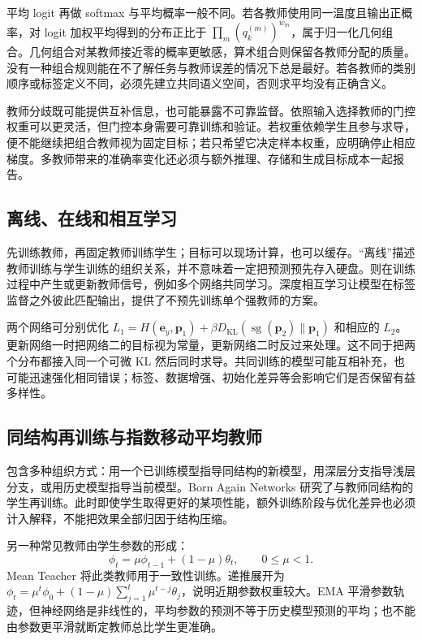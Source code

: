 \documentclass[UTF8,12pt,a4paper,fontset=fandol]{ctexart}
\begin{document}
平均 logit 再做 softmax 与平均概率一般不同。若各教师使用同一温度且输出正概率，对 logit 加权平均得到的分布正比于 $\prod_m(q_k^{(m)})^{w_m}$，属于归一化几何组合。几何组合对某教师接近零的概率更敏感，算术组合则保留各教师分配的质量。没有一种组合规则能在不了解任务与教师误差的情况下总是最好。若各教师的类别顺序或标签定义不同，必须先建立共同语义空间，否则求平均没有正确含义。

教师分歧既可能提供互补信息，也可能暴露不可靠监督。依照输入选择教师的门控权重可以更灵活，但门控本身需要可靠训练和验证。若权重依赖学生且参与求导，便不能继续把组合教师视为固定目标；若只希望它决定样本权重，应明确停止相应梯度。多教师带来的准确率变化还必须与额外推理、存储和生成目标成本一起报告。

\subsection{离线、在线和相互学习}
先训练教师，再固定教师训练学生；目标可以现场计算，也可以缓存。“离线”描述教师训练与学生训练的组织关系，并不意味着一定把预测预先存入硬盘。则在训练过程中产生或更新教师信号，例如多个网络共同学习。深度相互学习\cite{zhang2018}让模型在标签监督之外彼此匹配输出，提供了不预先训练单个强教师的方案。

两个网络可分别优化 $L_1=H(\mathbf e_y,\mathbf p_1)+\beta D_{\mathrm{KL}}(\operatorname{sg}(\mathbf p_2)\|\mathbf p_1)$ 和相应的 $L_2$。更新网络一时把网络二的目标视为常量，更新网络二时反过来处理。这不同于把两个分布都接入同一个可微 KL 然后同时求导。共同训练的模型可能互相补充，也可能迅速强化相同错误；标签、数据增强、初始化差异等会影响它们是否保留有益多样性。

\subsection{同结构再训练与指数移动平均教师}
包含多种组织方式：用一个已训练模型指导同结构的新模型，用深层分支指导浅层分支，或用历史模型指导当前模型。Born Again Networks 研究了与教师同结构的学生再训练\cite{furlanello2018}。此时即使学生取得更好的某项性能，额外训练阶段与优化差异也必须计入解释，不能把效果全部归因于结构压缩。

另一种常见教师由学生参数的形成：
\begin{equation}
 \phi_t=\mu\phi_{t-1}+(1-\mu)\theta_t,\qquad 0\leq\mu<1.
 \label{eq:kd-ema}
\end{equation}
Mean Teacher 将此类教师用于一致性训练\cite{tarvainen2017}。递推展开为 $\phi_t=\mu^t\phi_0+(1-\mu)\sum_{j=1}^t\mu^{t-j}\theta_j$，说明近期参数权重较大。EMA 平滑参数轨迹，但神经网络是非线性的，平均参数的预测不等于历史模型预测的平均；也不能由参数更平滑就断定教师总比学生更准确。
\end{document}

